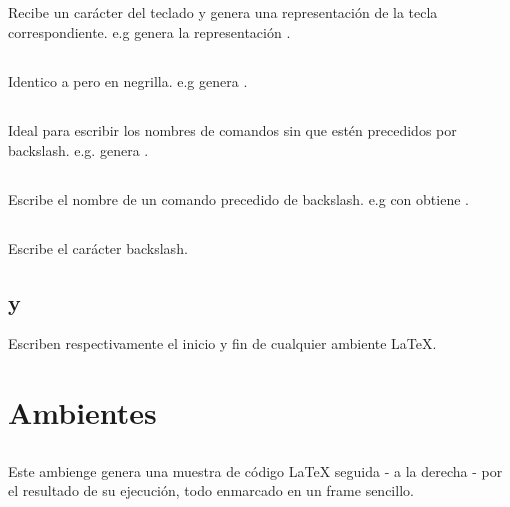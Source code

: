 \documentclass{article}
\begin{document}
	\subsection{}
		Recibe un carácter del teclado y genera una representación de la tecla correspondiente. e.g \texttt{\keystroke{\%}} genera la representación \keystroke{\%}.
		
	\subsection{}
		Identico a  pero en negrilla. e.g \texttt{} genera .
		
	\subsection{}
		Ideal para escribir los nombres de comandos sin que estén precedidos por backslash. e.g. \texttt{} genera .
		
	\subsection{}
		Escribe el nombre de un comando precedido de backslash. e.g con \texttt{} obtiene .
		
	\subsection{}	
		Escribe el carácter backslash.
		
	\subsection{ y }	
		Escriben respectivamente el inicio y fin de cualquier ambiente \LaTeX{}. 
		
	\section{Ambientes}
	
	\subsection{}
		Este ambienge genera una muestra de código \LaTeX{} seguida - a la derecha - por el resultado de su ejecución, todo enmarcado en un frame sencillo.
		
\end{document}

